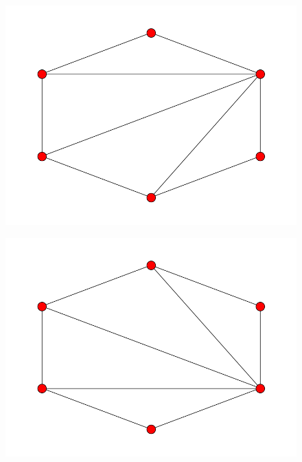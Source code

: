 \documentclass[fontsize=10pt]{article}
\begin{document}
\begin{figure}[hbtp]
\centering
\includegraphics[scale=0.5]{imgs/hexagon/hexagon_2.png}
\end{figure}

\begin{figure}[hbtp]
\centering
\includegraphics[scale=0.5]{imgs/hexagon/hexagon_3.png}
\end{figure}
\end{document}

